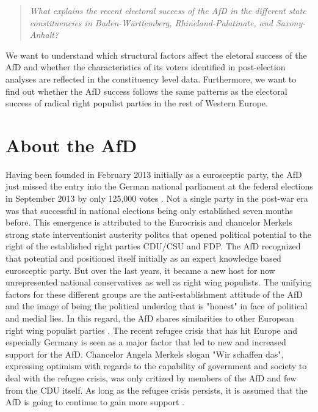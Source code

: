 \documentclass[12pt, hidelinks]{article}
\begin{document}
\begin{quote}
\textit{What explains the recent electoral success of the AfD in the different state constituencies in Baden-Württemberg, Rhineland-Palatinate, and Saxony-Anhalt?}
\end{quote}

We want to understand which structural factors affect the eletoral success of the AfD and whether the characteristics of its voters identified in post-election analyses are reflected in the constituency level data. Furthermore, we want to find out whether the AfD success follows the same patterns as the electoral success of radical right populist parties in the rest of Western Europe.

\section{About the AfD}
Having been founded in February 2013 initially as a eurosceptic party, the AfD just missed the entry into the German national parliament at the federal elections in September 2013 by only 125,000 votes \cite{schmitt2014euro}. Not a single party in the post-war era was that successful in national elections being only established seven months before\cite{niedermayer2015neue}. 
This emergence is attributed to the Eurocrisis and chancelor Merkels strong state interventionist austerity politcs that opened political potential to the right of the established right parties CDU/CSU and FDP. The AfD recognized that potential and positioned itself initially as an expert knowledge based eurosceptic party. But over the last years, it became a new host for now unrepresented national conservatives as well as right wing populists. The unifying factors for these different groups are the anti-establishment attitude of the AfD and the image of being the political underdog that is "honest" in face of political and medial lies. In this regard, the AfD shares similarities to other European right wing populist parties \cite{hausler2015rechten}. The recent refugee crisis that has hit Europe and especially Germany is seen as a major factor that led to new and increased support for the AfD. Chancelor Angela Merkels slogan "Wir schaffen das", expressing optimism with regards to the capability of government and society to deal with the refugee crisis, was only critized by members of the AfD and few from the CDU itself. As long as the refugee crisis persists, it is assumed that the AfD is going to continue to gain more support \cite{Spiegel2016}.
\end{document}
